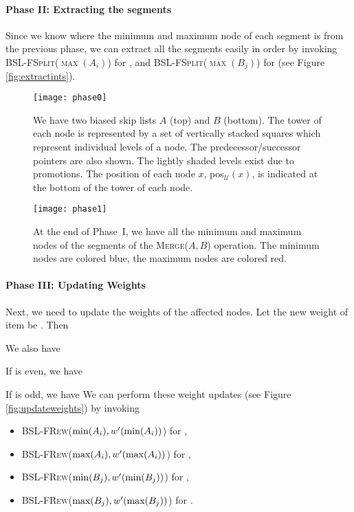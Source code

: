 \documentclass[11pt]{article}
\newcommand{\kwUnion}{Merge}
\newcommand{\Unionx}[2]{\mbox{\textsc{\kwUnion(\ensuremath{#1,#2})}}}
\newcommand{\Bslfsplx}[1]{\mbox{\textsc{BSL-FSplit(\ensuremath{#1})}}}
\newcommand{\Bslfrewx}[2]{\mbox{\textsc{BSL-FRew(\ensuremath{#1,#2})}}}
\newcommand{\segments}{{\segment}s}
\newcommand{\segment}{segment}
\newcommand{\universe}{\ensuremath{\mathcal U}}
\newcommand{\intmax}[1]{\ensuremath{\max(\intl #1)}}
\newcommand{\intmin}[1]{\ensuremath{\min(\intl #1)}}
\newcommand{\intl}[1]{\ensuremath{#1}}
\newcommand{\nodenewweight}[1]{{\ensuremath{w'(\node #1)}}}
\newcommand{\node}[1]{\ensuremath{#1}}
\newcommand{\nodeposition}[2]{pos\ensuremath{_{\set #1}(\node #2)}}
\newcommand{\set}[1]{\ensuremath{#1}}
\newcommand{\bsl}[1]{\ensuremath{#1}}
\begin{document}
\paragraph{Phase II: Extracting the \segments{}} 

Since we know where the minimum and maximum node of each \segment{} is from the previous phase, we can extract all the \segments{} easily in order by invoking \Bslfsplx{\intmax{A_i}} for , and \Bslfsplx{\intmax{B_j}} for  (see Figure \ref{fig:extractints}). 



\begin{figure}[H]
\centering 
\texttt{[image: phase0]} 
\caption{We have two biased skip lists \bsl A (top) and \bsl B (bottom). The tower of each node is represented by a set of vertically stacked squares which represent individual levels of a node. The predecessor/successor pointers are also shown. The lightly shaded levels exist due to promotions. The position of each node \node x, \nodeposition{\universe}{x}, is indicated at the bottom of the tower of each node.} 
\label{fig:example} 
\end{figure}
\begin{figure}[H]
\centering 
\texttt{[image: phase1]} 
\caption{At the end of Phase~I, we have all the minimum and maximum nodes of the \segments{} of the \Unionx{A}{B} operation. The minimum nodes are colored blue, the maximum nodes are colored red.} 
\label{fig:findints} 
\end{figure}




\paragraph{Phase III: Updating Weights} Next, we need to update the weights of the affected nodes. Let the new weight of item  be . Then 




{\allowdisplaybreaks 

}
We also have 
 
If  is even, we have 
 
If  is odd, we have 
  We can perform these weight updates (see Figure \ref{fig:updateweights}) by invoking 


\begin{itemize} 
\item \Bslfrewx{\intmin{A_i}}{\nodenewweight{\intmin{A_i}}} \quad for  , 
\item \Bslfrewx{\intmax{A_i}}{\nodenewweight{\intmax{A_i}}} \quad for  , 
\item \Bslfrewx{\intmin{B_j}}{\nodenewweight{\intmin{B_j}}} \quad for  , 
\item \Bslfrewx{\intmax{B_j}}{\nodenewweight{\intmax{B_j}}} \quad for  . 
\end{itemize} 
\end{document}
